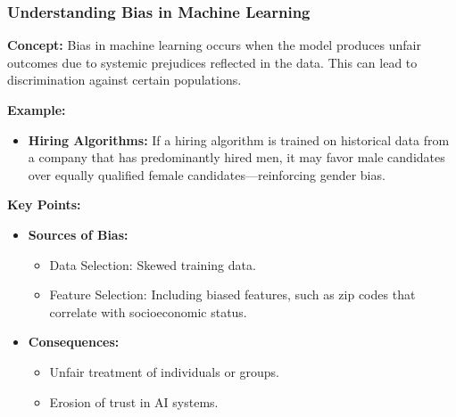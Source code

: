 \documentclass[aspectratio=169]{beamer}
\begin{document}
\begin{frame}[fragile]
    \frametitle{Understanding Bias in Machine Learning}
    \textbf{Concept:} Bias in machine learning occurs when the model produces unfair outcomes due to systemic prejudices reflected in the data. This can lead to discrimination against certain populations.
    
    \textbf{Example:} 
    \begin{itemize}
        \item \textbf{Hiring Algorithms:} If a hiring algorithm is trained on historical data from a company that has predominantly hired men, it may favor male candidates over equally qualified female candidates—reinforcing gender bias.
    \end{itemize}

    \textbf{Key Points:}
    \begin{itemize}
        \item \textbf{Sources of Bias:}
        \begin{itemize}
            \item Data Selection: Skewed training data.
            \item Feature Selection: Including biased features, such as zip codes that correlate with socioeconomic status.
        \end{itemize}
        
        \item \textbf{Consequences:}
        \begin{itemize}
            \item Unfair treatment of individuals or groups.
            \item Erosion of trust in AI systems.
        \end{itemize}
    \end{itemize}
\end{frame}
\end{document}
